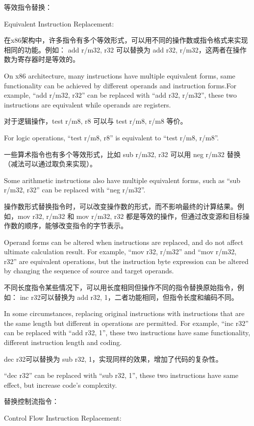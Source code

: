等效指令替换：

Equivalent Instruction Replacement:

在x86架构中，许多指令有多个等效形式，可以用不同的操作数或指令格式来实现相同的功能。例如：
add r/m32, r32 可以替换为 add r32, r/m32，这两者在操作数为寄存器时是等效的。

On x86 architecture, many instructions have multiple equivalent forms, same functionality can be achieved by different operands and instruction forms.For example, “add r/m32, r32” can be replaced with “add r32, r/m32”, these two instructions are equivalent while operands are registers.

对于逻辑操作，test r/m8, r8 可以与 test r/m8, r/m8 等价。

For logic operations, “test r/m8, r8” is equivalent to “test r/m8, r/m8”.

一些算术指令也有多个等效形式，比如 sub r/m32, r32 可以用 neg r/m32 替换（减法可以通过取负来实现）。

Some arithmetic instructions also have multiple equivalent forms, such as “sub r/m32, r32” can be replaced with “neg r/m32”.

操作数形式替换指令时，可以改变操作数的形式，而不影响最终的计算结果。例如，mov r32, r/m32 和 mov r/m32, r32 都是等效的操作，但通过改变源和目标操作数的顺序，能够改变指令的字节表示。

Operand forms can be altered when instructions are replaced, and do not affect ultimate calculation result. For example, “mov r32, r/m32” and “mov r/m32, r32” are equivalent operations, but the instruction byte expression can be altered by changing the sequence of source and target operands.

不同长度指令某些情况下，可以用长度相同但操作不同的指令替换原始指令，例如：
inc r32可以替换为 add r32, 1，二者功能相同，但指令长度和编码不同。

In some circumstances, replacing original instructions with instructions that are the same length but different in operations are permitted.
For example, “inc r32” can be replaced with “add r32, 1”, these two instructions have same functionality, different instruction length and coding.

dec r32可以替换为 sub r32, 1，实现同样的效果，增加了代码的复杂性。

“dec r32” can be replaced with “sub r32, 1”, these two instructions have same effect, but increase code's complexity.

替换控制流指令：

Control Flow Instruction Replacement:

